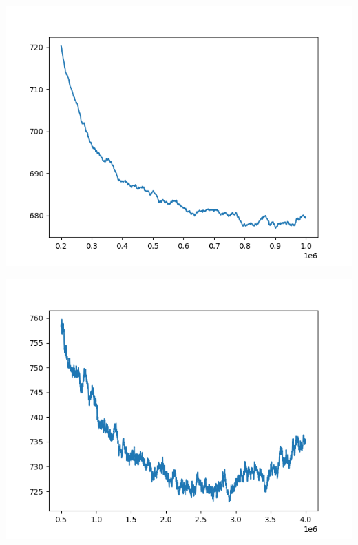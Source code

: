 \documentclass{article}
\begin{document}
\begin{enumerate}[label=\arabic*.]
\begin{minipage}{0.49\linewidth}
            \includegraphics[width=\linewidth]{../starter_code/figs/sgd_wo_k_80.png}
            \label{nobiasreg80}
        \end{minipage}\hfill
        \begin{minipage}{0.49\linewidth}
            \includegraphics[width=\linewidth]{../starter_code/figs/sgd_k80.png}
            \label{withbiasreg80}
        \end{minipage}\hfill
        \begin{minipage}{0.49\linewidth}

\end{minipage}
\end{enumerate}
\end{document}
